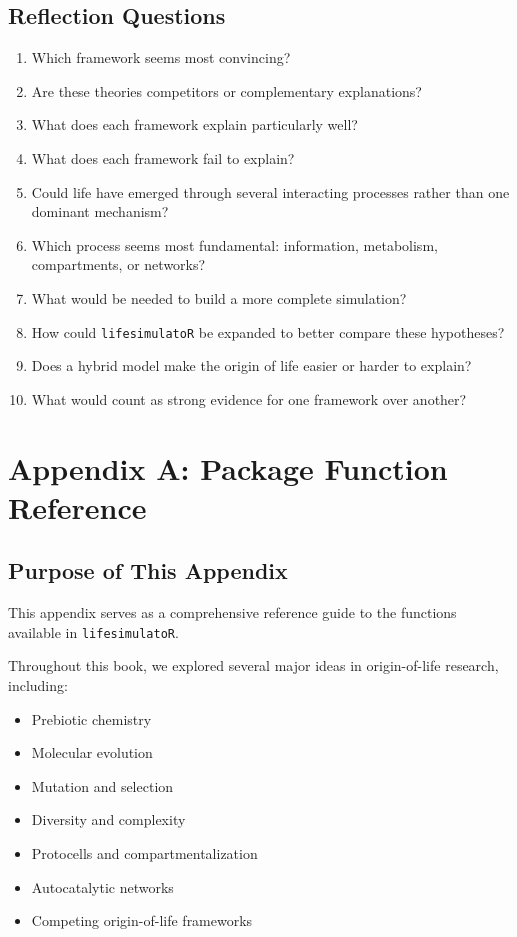 \documentclass[
  oneside,
  openany]{book}
\providecommand{\tightlist}{%
  \setlength{\itemsep}{0pt}\setlength{\parskip}{0pt}}
\begin{document}
\section{Reflection Questions}\label{reflection-questions-6}

\begin{enumerate}
\def\labelenumi{\arabic{enumi}.}
\tightlist
\item
  Which framework seems most convincing?
\item
  Are these theories competitors or complementary explanations?
\item
  What does each framework explain particularly well?
\item
  What does each framework fail to explain?
\item
  Could life have emerged through several interacting processes rather than one dominant mechanism?
\item
  Which process seems most fundamental: information, metabolism, compartments, or networks?
\item
  What would be needed to build a more complete simulation?
\item
  How could \texttt{lifesimulatoR} be expanded to better compare these hypotheses?
\item
  Does a hybrid model make the origin of life easier or harder to explain?
\item
  What would count as strong evidence for one framework over another?
\end{enumerate}

\chapter{Appendix A: Package Function Reference}\label{appendix-a-package-function-reference}

\section{Purpose of This Appendix}\label{purpose-of-this-appendix}

This appendix serves as a comprehensive reference guide to the functions available in \texttt{lifesimulatoR}.

Throughout this book, we explored several major ideas in origin-of-life research, including:

\begin{itemize}
\tightlist
\item
  Prebiotic chemistry
\item
  Molecular evolution
\item
  Mutation and selection
\item
  Diversity and complexity
\item
  Protocells and compartmentalization
\item
  Autocatalytic networks
\item
  Competing origin-of-life frameworks
\end{itemize}
\end{document}

